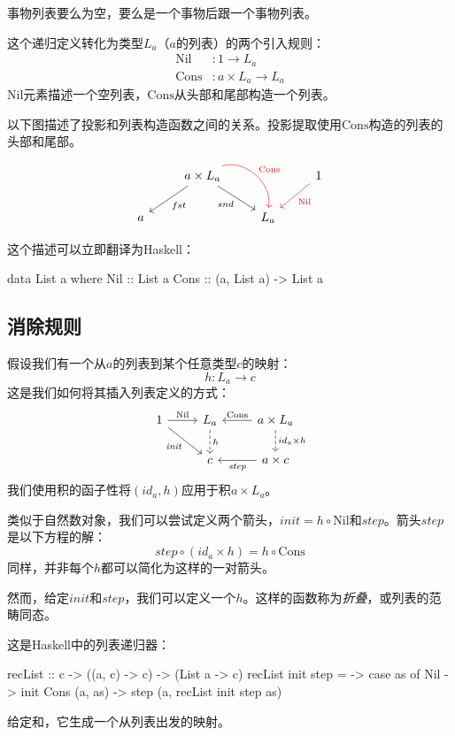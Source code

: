 \documentclass[DaoFP]{subfiles}
\begin{document}
事物列表要么为空，要么是一个事物后跟一个事物列表。

这个递归定义转化为类型$L_a$（$a$的列表）的两个引入规则：
\begin{align*}
 \text{Nil} &\colon 1 \to L_a \\
 \text{Cons} &\colon a \times L_a \to L_a 
\end{align*}
$\text{Nil}$元素描述一个空列表，$\text{Cons}$从头部和尾部构造一个列表。

以下图描述了投影和列表构造函数之间的关系。投影提取使用$\text{Cons}$构造的列表的头部和尾部。
\[
 \begin{tikzcd}
 & a \times L_a
 \arrow[ld, "fst"]
 \arrow[rd,  "snd"']
 \arrow[rd, bend left=60, red, "\text{Cons}"]
 && 1
 \arrow[ld, red, "\text{Nil}"]
 \\
 a
&&L_a
  \end{tikzcd}
\]

这个描述可以立即翻译为Haskell：
\begin{haskell}
data List a where
  Nil  :: List a
  Cons :: (a, List a) -> List a
\end{haskell}



\subsection{消除规则}

假设我们有一个从$a$的列表到某个任意类型$c$的映射：
\[h \colon L_a \to c\]
这是我们如何将其插入列表定义的方式：
\[
 \begin{tikzcd}
 1
 \arrow[r, "\text{Nil}"]
 \arrow[rd, "\mathit{init}"']
 &L_a
\arrow[d, dashed, "h"]
&a \times L_a
  \arrow[l, "\text{Cons}"']
\arrow[d, dashed, "id_a \times h"]
\\
& c
& a \times c
\arrow[l, "\mathit{step}"]
  \end{tikzcd}
\]
我们使用积的函子性将$(id_a, h)$应用于积$a \times L_a$。

类似于自然数对象，我们可以尝试定义两个箭头，$\mathit{init} = h \circ \text{Nil}$和$\mathit{step}$。箭头$\mathit{step}$是以下方程的解：
\[ \mathit{step} \circ (id_a \times h) = h \circ \text{Cons} \]
同样，并非每个$h$都可以简化为这样的一对箭头。

然而，给定$\mathit{init}$和$\mathit{step}$，我们可以定义一个$h$。这样的函数称为\emph{折叠}，或列表的范畴同态。

这是Haskell中的列表递归器：
\begin{haskell}
recList :: c -> ((a, c) -> c) -> (List a -> c)
recList init step = \as ->
  case as of 
    Nil          -> init
    Cons (a, as) -> step (a, recList init step as)
\end{haskell}
给定和，它生成一个从列表出发的映射。
\end{document}
